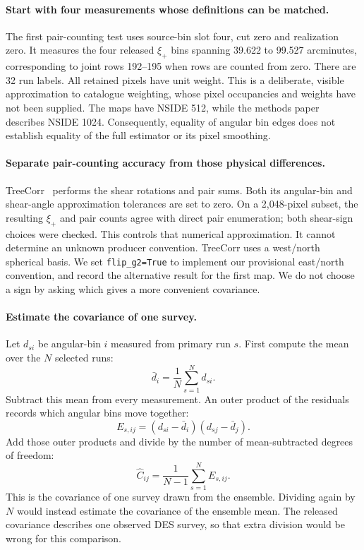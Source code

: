 \documentclass[11pt]{article}
\begin{document}
\paragraph{Start with four measurements whose definitions can be matched.}
The first pair-counting test uses source-bin slot four, cut zero and
realization zero. It measures the four released $\xi_+$ bins spanning
39.622 to 99.527 arcminutes, corresponding to joint rows 192--195 when rows
are counted from zero. There are 32 run labels. All retained pixels have
unit weight. This is a deliberate, visible approximation to catalogue
weighting, whose pixel occupancies and weights have not been supplied.
The maps have NSIDE 512, while the methods paper describes NSIDE 1024.
Consequently, equality of angular bin edges does not establish equality of
the full estimator or its pixel smoothing.

\paragraph{Separate pair-counting accuracy from those physical differences.}
TreeCorr~\cite{treecorr} performs the shear rotations and pair sums.
Both its angular-bin and shear-angle approximation tolerances are set to
zero. On a 2,048-pixel subset, the resulting $\xi_+$ and pair counts agree
with direct pair enumeration; both shear-sign choices were checked.
This controls that numerical approximation. It cannot determine an unknown
producer convention. TreeCorr uses a west/north spherical basis. We set
\texttt{flip\_g2=True} to implement our provisional east/north convention,
and record the alternative result for the first map. We do not choose a
sign by asking which gives a more convenient covariance.

\paragraph{Estimate the covariance of one survey.}
Let $d_{si}$ be angular-bin $i$ measured from primary run $s$. First compute
the mean over the $N$ selected runs:
\begin{equation}
 \bar d_i=\frac{1}{N}\sum_{s=1}^{N}d_{si}.
\end{equation}
Subtract this mean from every measurement. An outer product of the
residuals records which angular bins move together:
\begin{equation}
 E_{s,ij}=(d_{si}-\bar d_i)(d_{sj}-\bar d_j).
\end{equation}
Add those outer products and divide by the number of mean-subtracted
degrees of freedom:
\begin{equation}
 \widehat C_{ij}=\frac{1}{N-1}\sum_{s=1}^{N}E_{s,ij}.
\end{equation}
This is the covariance of one survey drawn from the ensemble. Dividing
again by $N$ would instead estimate the covariance of the ensemble mean.
The released covariance describes one observed DES survey, so that extra
division would be wrong for this comparison.
\end{document}
